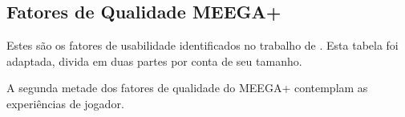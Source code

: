\begin{anexosenv}


\chapter{Fatores de Qualidade MEEGA+}
\label{an:meega}

Estes são os fatores de usabilidade identificados no trabalho de . Esta tabela foi adaptada, divida em duas partes por conta de seu tamanho.


\newpage

A segunda metade dos fatores de qualidade do MEEGA+ contemplam as experiências de jogador.



\end{anexosenv}


